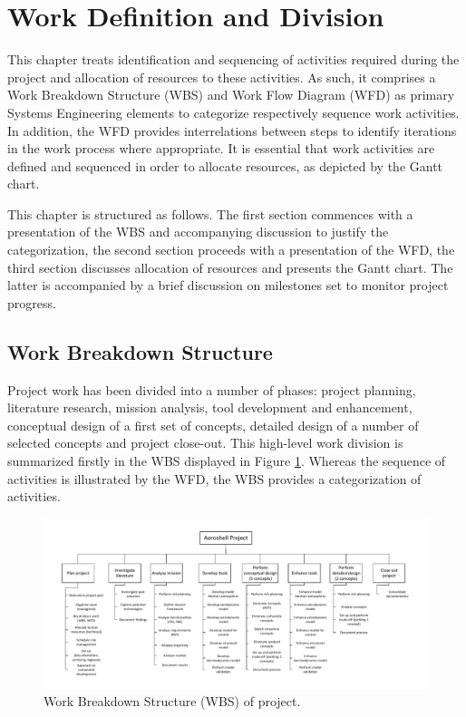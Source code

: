 \section{Work Definition and Division}
This chapter treats identification and sequencing of activities required during the project and allocation of resources to these activities. As such, it comprises a Work Breakdown Structure (WBS) and Work Flow Diagram (WFD) as primary Systems Engineering elements to categorize respectively sequence work activities. In addition, the WFD provides interrelations between steps to identify iterations in the work process where appropriate. It is essential that work activities are defined and sequenced in order to allocate resources, as depicted by the Gantt chart.

This chapter is structured as follows. The first section commences with a presentation of the WBS and accompanying discussion to justify the categorization, the second section proceeds with a presentation of the WFD, the third section discusses allocation of resources and presents the Gantt chart. The latter is accompanied by a brief discussion on milestones set to monitor project progress.

\subsection{Work Breakdown Structure}\label{sec:WBS}
Project work has been divided into a number of phases: project planning, literature research, mission analysis, tool development and enhancement, conceptual design of a first set of concepts, detailed design of a number of selected concepts and project close-out. This high-level work division is summarized firstly in the WBS displayed in Figure \ref{fig:wbs}. Whereas the sequence of activities is illustrated by the WFD, the WBS provides a categorization of activities. 

\begin{figure}
    \includegraphics{Figure/WBS.pdf}
    \caption{Work Breakdown Structure (WBS) of project.}
    \label{fig:wbs}
\end{figure}

